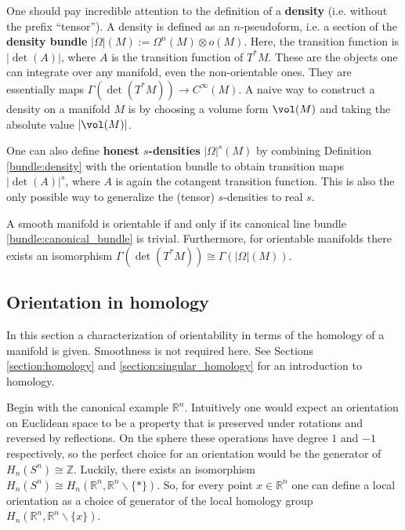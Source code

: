     \begin{remark}\label{bundle:honest_density}
        One should pay incredible attention to the definition of a \textbf{density} (i.e. without the prefix ``tensor''). A density is defined as an $n$-pseudoform, i.e. a section of the \textbf{density bundle} $|\Omega|(M):=\Omega^n(M)\otimes o(M)$. Here, the transition function is $|\det(A)|$, where $A$ is the transition function of $T^*M$. These are the objects one can integrate over any manifold, even the non-orientable ones. They are essentially maps $\Gamma(\det(T^*M))\rightarrow C^\infty(M)$. A naive way to construct a density on a manifold $M$ is by choosing a volume form $\vol(M)$ and taking the absolute value $|\vol(M)|$.

        One can also define \textbf{honest $s$-densities} $|\Omega|^s(M)$ by combining Definition \ref{bundle:density} with the orientation bundle to obtain transition maps $|\det(A)|^s$, where $A$ is again the cotangent transition function. This is also the only possible way to generalize the (tensor) $s$-densities to real $s$.
    \end{remark}
    \begin{property}[Orientability]
        A smooth manifold is orientable if and only if its canonical line bundle \ref{bundle:canonical_bundle} is trivial. Furthermore, for orientable manifolds there exists an isomorphism $\Gamma(\det(T^*M))\cong\Gamma(|\Omega|(M))$.
    \end{property}

\subsection{Orientation in homology}

    In this section a characterization of orientability in terms of the homology of a manifold is given. Smoothness is not required here. See Sections \ref{section:homology} and \ref{section:singular_homology} for an introduction to homology.

    Begin with the canonical example $\mathbb{R}^n$. Intuitively one would expect an orientation on Euclidean space to be a property that is preserved under rotations and reversed by reflections. On the sphere these operations have degree $1$ and $-1$ respectively, so the perfect choice for an orientation would be the generator of $H_n(S^n)\cong\mathbb{Z}$. Luckily, there exists an isomorphism $H_n(S^n)\cong H_n(\mathbb{R}^n,\mathbb{R}^n\backslash\{\ast\})$. So, for every point $x\in\mathbb{R}^n$ one can define a local orientation as a choice of generator of the local homology group $H_n(\mathbb{R}^n,\mathbb{R}^n\backslash\{x\})$.

